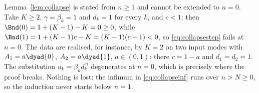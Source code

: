 
\begin{remark}
\label{rem:n0}
Lemma~\ref{lem:collapse} is stated from $n\ge1$ and cannot be extended to
$n=0$. Take $K\ge2$, $\gamma=\beta_k=1$ and $d_k=1$ for every $k$, and $c<1$: then
$\Bnd(0)=1+(K-1)-K=0\ge0$, while
$\Bnd(1)=1+(K-1)c-K=(K-1)(c-1)<0$, so \eqref{eq:collapsestep} fails at $n=0$.
The data are realised, for instance, by $K=2$ on two input modes with
$A_1=a\dyad{0}$, $A_2=a\dyad{1}$, $a\in(0,1)$: there $c=1-a$ and
$d_1=d_2=1$. The substitution $u_k=\beta_kd_k^{\,n}$ degenerates at $n=0$,
which is precisely where the proof breaks. Nothing is lost: the infimum in
\eqref{eq:collapseinf} runs over $n>N\ge0$, so the induction never starts below
$n=1$.
\end{remark}
